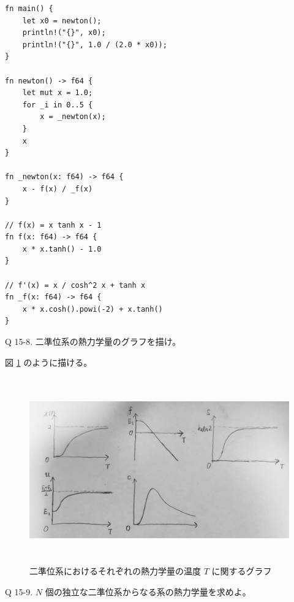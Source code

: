 \documentclass[uplatex,dvipdfmx,a4paper,11pt]{jlreq}
\theoremstyle{definition}
\begin{document}
\begin{lstlisting}[caption=Newton 法による,label=newton]
fn main() {
    let x0 = newton();
    println!("{}", x0);
    println!("{}", 1.0 / (2.0 * x0));
}

fn newton() -> f64 {
    let mut x = 1.0;
    for _i in 0..5 {
        x = _newton(x);
    }
    x
}

fn _newton(x: f64) -> f64 {
    x - f(x) / _f(x)
}

// f(x) = x tanh x - 1
fn f(x: f64) -> f64 {
    x * x.tanh() - 1.0
}

// f'(x) = x / cosh^2 x + tanh x
fn _f(x: f64) -> f64 {
    x * x.cosh().powi(-2) + x.tanh()
}
\end{lstlisting}

\begin{itembox}[l]{Q 15-8.}
  二準位系の熱力学量のグラフを描け。
\end{itembox}

図 \ref{fig:2level} のように描ける。

\begin{figure}[htbp]
  \begin{center}
    \includegraphics[height=8cm]{2level_system.jpg}
    \caption{二準位系におけるそれぞれの熱力学量の温度 $T$ に関するグラフ}
    \label{fig:2level}
  \end{center}
\end{figure}

\begin{itembox}[l]{Q 15-9.}
  $N$ 個の独立な二準位系からなる系の熱力学量を求めよ。
\end{itembox}
\end{document}
